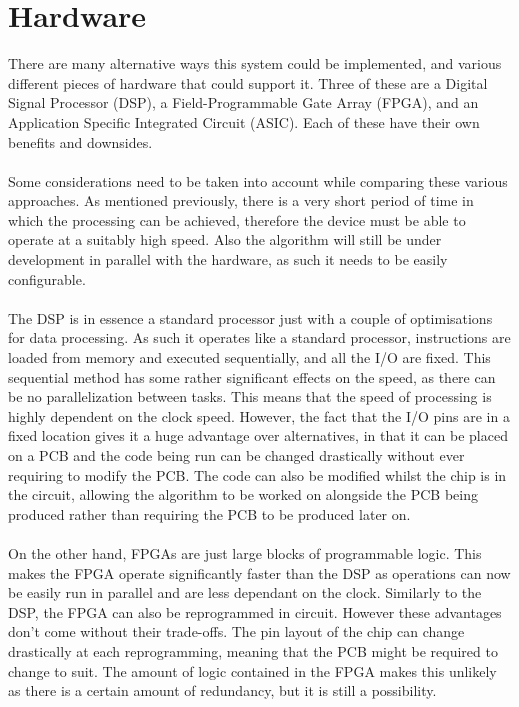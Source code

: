 \section{Hardware}
There are many alternative ways this system could be implemented, and various different pieces of hardware that could support it.
Three of these are a Digital Signal Processor (DSP), a Field-Programmable Gate Array (FPGA), and an Application Specific Integrated Circuit (ASIC).
Each of these have their own benefits and downsides.
\\
\\
Some considerations need to be taken into account while comparing these various approaches.
As mentioned previously, there is a very short period of time in which the processing can be achieved, therefore the device must be able to operate at a suitably high speed.
Also the algorithm will still be under development in parallel with the hardware, as such it needs to be easily configurable.
\\
\\
The DSP is in essence a standard processor just with a couple of optimisations for data processing.
As such it operates like a standard processor, instructions are loaded from memory and executed sequentially, and all the I/O are fixed.
This sequential method has some rather significant effects on the speed, as there can be no parallelization between tasks.
This means that the speed of processing is highly dependent on the clock speed.
However, the fact that the I/O pins are in a fixed location gives it a huge advantage over alternatives, in that it can be placed on a PCB and the code being run can be changed drastically without ever requiring to modify the PCB.
The code can also be modified whilst the chip is in the circuit, allowing the algorithm to be worked on alongside the PCB being produced rather than requiring the PCB to be produced later on.
\\
\\
On the other hand, FPGAs are just large blocks of programmable logic.
This makes the FPGA operate significantly faster than the DSP as operations can now be easily run in parallel and are less dependant on the clock.
Similarly to the DSP, the FPGA can also be reprogrammed in circuit.
However these advantages don't come without their trade-offs.
The pin layout of the chip can change drastically at each reprogramming, meaning that the PCB might be required to change to suit.
The amount of logic contained in the FPGA makes this unlikely as there is a certain amount of redundancy, but it is still a possibility.
